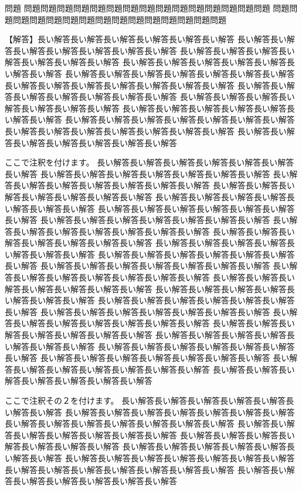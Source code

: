 \documentclass[a4j,fleqn]{jarticle}
\begin{document}
\begin{itembox}{問題}
問題問題問題問題問題問題問題問題問題問題問題問題問題問題問題
問題問題問題問題問題問題問題問題問題問題問題問題問題問題問題
\end{itembox}
\tyuukeisenfalse
\begin{tyuukai}
【解答】長い解答長い解答長い解答長い解答長い解答長い解答
長い解答長い解答長い解答長い解答長い解答長い解答長い解答
長い解答長い解答長い解答長い解答長い解答長い解答長い解答
長い解答長い解答長い解答長い解答長い解答長い解答長い解答
長い解答長い解答長い解答長い解答長い解答長い解答長い解答
長い解答長い解答長い解答長い解答長い解答長い解答長い解答
長い解答長い解答長い解答長い解答長い解答長い解答長い解答
長い解答長い解答長い解答長い解答長い解答長い解答長い解答
長い解答長い解答長い解答長い解答長い解答長い解答長い解答
長い解答長い解答長い解答長い解答長い解答長い解答長い解答
長い解答長い解答長い解答長い解答長い解答長い解答長い解答
長い解答長い解答長い解答長い解答長い解答長い解答長い解答

ここで注釈を付けます。
長い解答長い解答長い解答長い解答長い解答長い解答長い解答
長い解答長い解答長い解答長い解答長い解答長い解答長い解答
長い解答長い解答長い解答長い解答長い解答長い解答長い解答
長い解答長い解答長い解答長い解答長い解答長い解答長い解答
長い解答長い解答長い解答長い解答長い解答長い解答長い解答
長い解答長い解答長い解答長い解答長い解答長い解答長い解答
長い解答長い解答長い解答長い解答長い解答長い解答長い解答
長い解答長い解答長い解答長い解答長い解答長い解答長い解答
長い解答長い解答長い解答長い解答長い解答長い解答長い解答
長い解答長い解答長い解答長い解答長い解答長い解答長い解答
長い解答長い解答長い解答長い解答長い解答長い解答長い解答
長い解答長い解答長い解答長い解答長い解答長い解答長い解答
長い解答長い解答長い解答長い解答長い解答長い解答長い解答
長い解答長い解答長い解答長い解答長い解答長い解答長い解答
長い解答長い解答長い解答長い解答長い解答長い解答長い解答
長い解答長い解答長い解答長い解答長い解答長い解答長い解答
長い解答長い解答長い解答長い解答長い解答長い解答長い解答
長い解答長い解答長い解答長い解答長い解答長い解答長い解答
長い解答長い解答長い解答長い解答長い解答長い解答長い解答
長い解答長い解答長い解答長い解答長い解答長い解答長い解答
長い解答長い解答長い解答長い解答長い解答長い解答長い解答
長い解答長い解答長い解答長い解答長い解答長い解答長い解答
長い解答長い解答長い解答長い解答長い解答長い解答長い解答
長い解答長い解答長い解答長い解答長い解答長い解答長い解答

ここで注釈その２を付けます。
長い解答長い解答長い解答長い解答長い解答長い解答長い解答
長い解答長い解答長い解答長い解答長い解答長い解答長い解答
長い解答長い解答長い解答長い解答長い解答長い解答長い解答
長い解答長い解答長い解答長い解答長い解答長い解答長い解答
長い解答長い解答長い解答長い解答長い解答長い解答長い解答
長い解答長い解答長い解答長い解答長い解答長い解答長い解答
長い解答長い解答長い解答長い解答長い解答長い解答長い解答
長い解答長い解答長い解答長い解答長い解答長い解答長い解答
長い解答長い解答長い解答長い解答長い解答長い解答長い解答
\end{tyuukai}
\end{document}
